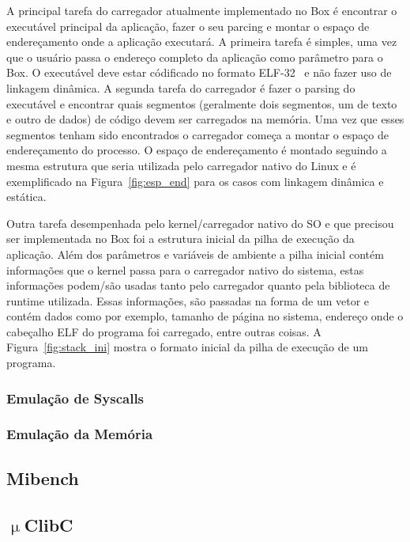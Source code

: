 \documentclass[11pt,twoside]{article}
\begin{document}
A principal tarefa do carregador atualmente implementado no Box é 
encontrar o executável principal da aplicação, fazer o seu parcing e
montar o espaço de endereçamento onde a aplicação executará. A primeira
tarefa é simples, uma vez que o usuário passa o endereço completo da
aplicação como parâmetro para o Box. O executável deve estar códificado
no formato ELF-32~\cite{elf} e não fazer uso de linkagem dinâmica. A 
segunda tarefa do carregador é fazer o parsing do executável e encontrar
quais segmentos (geralmente dois segmentos, um de texto e outro de dados) 
de código devem ser carregados na memória. Uma vez que esses segmentos 
tenham sido encontrados o carregador começa a montar o espaço de 
endereçamento do processo. O espaço de endereçamento é montado seguindo
a mesma estrutura que seria utilizada pelo carregador nativo do Linux e
é exemplificado na Figura~\ref{fig:esp_end} para os casos com linkagem
dinâmica e estática.

Outra tarefa desempenhada pelo kernel/carregador nativo do SO e que
precisou ser implementada no Box foi a estrutura inicial da pilha de
execução da aplicação. Além dos parâmetros e variáveis de ambiente a
pilha inicial contém informações que o kernel passa para o carregador
nativo do sistema, estas informações podem/são usadas tanto pelo
carregador quanto pela biblioteca de runtime utilizada. Essas informações,
são passadas na forma de um vetor e contém dados como por exemplo, 
tamanho de página no sistema, endereço onde o cabeçalho ELF do 
programa foi carregado, entre outras coisas. A Figura~\ref{fig:stack_ini}
mostra o formato inicial da pilha de execução de um programa.


\subsubsection{Emulação de Syscalls}

\subsubsection{Emulação da Memória}

\subsection{Mibench}

\subsection{$\upmu$ClibC}
\end{document}
